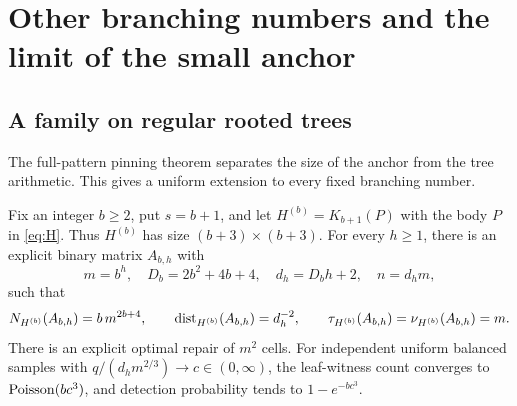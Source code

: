 \section{Other branching numbers and the limit of the small anchor}
\label{sec:branching}

\subsection{A family on regular rooted trees}

The full-pattern pinning theorem separates the size of the anchor from
the tree arithmetic. This gives a uniform extension to every fixed
branching number.

\begin{theorem}
\label{thm:branching}
Fix an integer \(b\ge2\), put \(s=b+1\), and let
\(H^{(b)}=K_{b+1}(P)\) with the body \(P\) in \eqref{eq:H}.
Thus \(H^{(b)}\) has size \((b+3)\times(b+3)\). For every \(h\ge1\),
there is an explicit binary matrix \(A_{b,h}\) with
\begin{equation}
 m=b^h,\quad D_b=2b^2+4b+4,\quad d_h=D_bh+2,\quad n=d_hm,
 \label{eq:bary-size}
\end{equation}
such that
\begin{equation}
 N_{H^{(b)}}(A_{b,h})=b\,m^{2b+4},\qquad
 \operatorname{dist}_{H^{(b)}}(A_{b,h})=d_h^{-2},\qquad
 \tau_{H^{(b)}}(A_{b,h})=\nu_{H^{(b)}}(A_{b,h})=m.
 \label{eq:bary-exact}
\end{equation}
There is an explicit optimal repair of \(m^2\) cells. For independent
uniform balanced samples with \(q/(d_hm^{2/3})\to c\in(0,\infty)\),
the leaf-witness count converges to \(\operatorname{Poisson}(bc^3)\), and detection
probability tends to \(1-e^{-bc^3}\).
\end{theorem}
